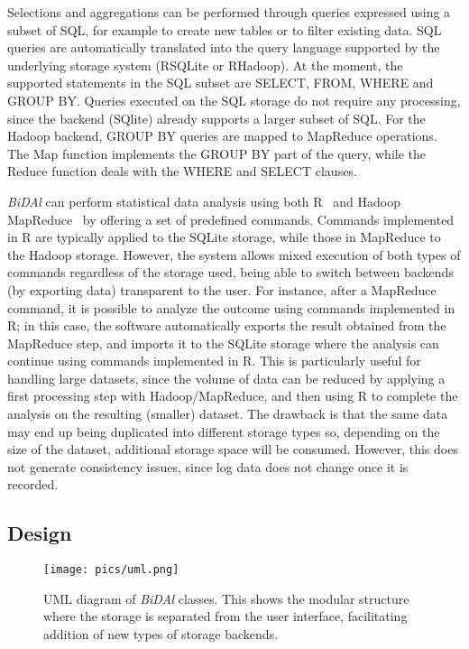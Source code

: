 \documentclass{article}
\begin{document}
Selections and aggregations can be performed through queries expressed using a subset of SQL, for example to create new tables or to filter existing data. SQL queries are automatically translated into the query language supported by the underlying storage system (RSQLite or RHadoop). At the moment, the supported statements in the SQL subset are SELECT, FROM, WHERE and GROUP BY.  Queries executed on the SQL storage do not require any processing, since the backend (SQlite) already supports a larger subset of SQL. For the Hadoop backend, GROUP BY queries are mapped to MapReduce operations. The Map function implements the GROUP BY part of the query, while the Reduce function deals with the WHERE and SELECT clauses.

\emph{BiDAl} can perform statistical data analysis using both R~\cite{r} and Hadoop MapReduce~\cite{hadoop,mapreduce} by offering a set of predefined commands. Commands implemented in R are typically applied to the SQLite storage, while those in MapReduce to the Hadoop storage. However, the system allows mixed execution of both types of commands regardless of the storage used, being able to switch between backends (by exporting data) transparent to the user. For instance, after a MapReduce command, it is possible to analyze the outcome using commands implemented in R; in this case, the software automatically exports the result obtained from the MapReduce step, and imports it to the SQLite storage where the analysis can continue using commands implemented in R. This is particularly useful for handling large datasets, since the volume of data can be reduced by applying a first processing step with Hadoop/MapReduce, and then using R to complete the analysis on the resulting (smaller) dataset. The drawback is that the same data may end up being duplicated into different storage types so, depending on the size of the dataset, additional storage space will be consumed. However, this does not generate consistency issues, since log data does not change once it is recorded.

\subsection{Design}

\begin{figure}
\centering
  \texttt{[image: pics/uml.png]}
\caption{UML diagram of \emph{BiDAl} classes. This shows the modular structure where the storage is separated from the user interface, facilitating addition of new types of storage backends. }
\label{fig:uml}       
\end{figure}
\end{document}
